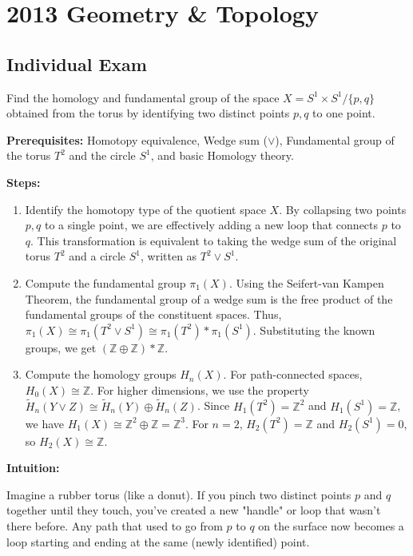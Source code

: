 \section{2013 Geometry \& Topology}

\subsection{Individual Exam}

\begin{exercise}
\label{geometry:2013:1}
Find the homology and fundamental group of the space $X = S^{1} \times S^{1} / \{p, q\}$ obtained from the torus by identifying two distinct points $p, q$ to one point.
\end{exercise}

\begin{solution}
\textbf{Prerequisites:} Homotopy equivalence, Wedge sum ($\vee$), Fundamental group of the torus $T^2$ and the circle $S^1$, and basic Homology theory.

\textbf{Steps:}
\begin{enumerate}
    \item Identify the homotopy type of the quotient space $X$. By collapsing two points $p, q$ to a single point, we are effectively adding a new loop that connects $p$ to $q$. This transformation is equivalent to taking the wedge sum of the original torus $T^2$ and a circle $S^1$, written as $T^2 \vee S^1$.

    \item Compute the fundamental group $\pi_1(X)$. Using the Seifert-van Kampen Theorem, the fundamental group of a wedge sum is the free product of the fundamental groups of the constituent spaces. Thus, $\pi_1(X) \cong \pi_1(T^2 \vee S^1) \cong \pi_1(T^2) * \pi_1(S^1)$. Substituting the known groups, we get $(\mathbb{Z} \oplus \mathbb{Z}) * \mathbb{Z}$.

    \item Compute the homology groups $H_n(X)$. For path-connected spaces, $H_0(X) \cong \mathbb{Z}$. For higher dimensions, we use the property $\tilde{H}_n(Y \vee Z) \cong \tilde{H}_n(Y) \oplus \tilde{H}_n(Z)$. Since $H_1(T^2) = \mathbb{Z}^2$ and $H_1(S^1) = \mathbb{Z}$, we have $H_1(X) \cong \mathbb{Z}^2 \oplus \mathbb{Z} = \mathbb{Z}^3$. For $n=2$, $H_2(T^2) = \mathbb{Z}$ and $H_2(S^1) = 0$, so $H_2(X) \cong \mathbb{Z}$.
\end{enumerate}

\textbf{Intuition:}

Imagine a rubber torus (like a donut). If you pinch two distinct points $p$ and $q$ together until they touch, you've created a new "handle" or loop that wasn't there before. Any path that used to go from $p$ to $q$ on the surface now becomes a loop starting and ending at the same (newly identified) point.


\end{solution}
